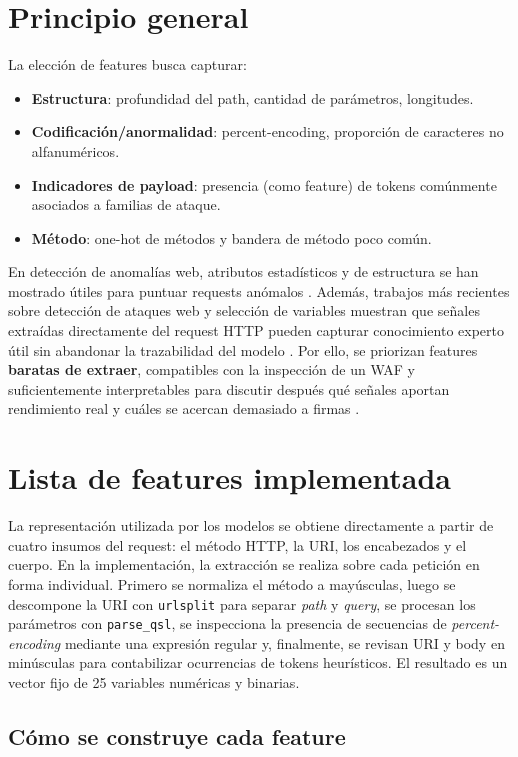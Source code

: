 \documentclass[12pt,oneside]{report}
\begin{document}
\section{Principio general}
La elección de features busca capturar:
\begin{itemize}[leftmargin=*]
  \item \textbf{Estructura}: profundidad del path, cantidad de parámetros, longitudes.
  \item \textbf{Codificación/anormalidad}: percent-encoding, proporción de caracteres no alfanuméricos.
  \item \textbf{Indicadores de payload}: presencia (como feature) de tokens comúnmente asociados a familias de ataque.
  \item \textbf{Método}: one-hot de métodos y bandera de método poco común.
\end{itemize}
En detección de anomalías web, atributos estadísticos y de estructura se han mostrado útiles para puntuar requests anómalos \cite{kruegel_vigna_2003}. Además, trabajos más recientes sobre detección de ataques web y selección de variables muestran que señales extraídas directamente del request HTTP pueden capturar conocimiento experto útil sin abandonar la trazabilidad del modelo \cite{riverol_2024,srbh_paper}. Por ello, se priorizan features \textbf{baratas de extraer}, compatibles con la inspección de un WAF y suficientemente interpretables para discutir después qué señales aportan rendimiento real y cuáles se acercan demasiado a firmas \cite{owasp_waf,modsecurity_site}.


\section{Lista de features implementada}
La representación utilizada por los modelos se obtiene directamente a partir de cuatro insumos del request: el método HTTP, la URI, los encabezados y el cuerpo. En la implementación, la extracción se realiza sobre cada petición en forma individual. Primero se normaliza el método a mayúsculas, luego se descompone la URI con \texttt{urlsplit} para separar \textit{path} y \textit{query}, se procesan los parámetros con \texttt{parse\_qsl}, se inspecciona la presencia de secuencias de \textit{percent-encoding} mediante una expresión regular y, finalmente, se revisan URI y body en minúsculas para contabilizar ocurrencias de tokens heurísticos. El resultado es un vector fijo de 25 variables numéricas y binarias.

\subsection{Cómo se construye cada feature}
\end{document}
